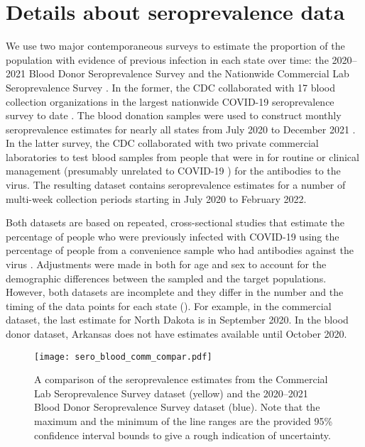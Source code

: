 \section{Details about seroprevalence data}
\label{sec:sero-details}

We use two major contemporaneous surveys to estimate the proportion of the
population with evidence of previous infection in each state over time: the
2020--2021 Blood Donor Seroprevalence Survey and the Nationwide Commercial Lab
Seroprevalence Survey \citep{cdc2021blood, cdc2021comm}. In the former, the CDC
collaborated with 17 blood collection organizations in the largest nationwide
COVID-19 seroprevalence survey to date \citep{cdc2021blood}. The blood donation
samples were used to construct monthly seroprevalence estimates for nearly all
states from July 2020 to December 2021 \citep{jones2021estimated}. In the latter
survey, the CDC collaborated with two private commercial laboratories to test
blood samples from people that were in for routine or clinical management
(presumably unrelated to COVID-19 \citealp{bajema2021estimated}) for the
antibodies to the virus. The resulting dataset contains seroprevalence estimates
for a number of multi-week collection periods starting in July 2020 to February
2022. 

Both datasets are based on repeated, cross-sectional studies that estimate the
percentage of people who were previously infected with COVID-19 using the
percentage of people from a convenience sample who had antibodies against the
virus \citep{bajema2021estimated, cdc2020data, jones2021estimated}. Adjustments
were made in both for age and sex to account for the demographic differences
between the sampled and the target populations. However, both datasets are
incomplete and they differ in the number and the timing of the data points for
each state (). For example, in the
commercial dataset, the last estimate for North Dakota is in September 2020. In
the blood donor dataset, Arkansas does not have estimates available until
October 2020. 

\begin{figure}[!tb]
\centering
    \texttt{[image: sero\_blood\_comm\_compar.pdf]}
    \caption{A comparison of the seroprevalence estimates from the Commercial
    Lab Seroprevalence Survey dataset (yellow) and the 2020--2021 Blood Donor 
    Seroprevalence Survey dataset (blue). Note that the maximum and the minimum
    of the line ranges are the provided 95\% confidence interval bounds to 
    give a rough indication of uncertainty.}
    \label{fig:sero-blood-comm-compar}
\end{figure}
    
